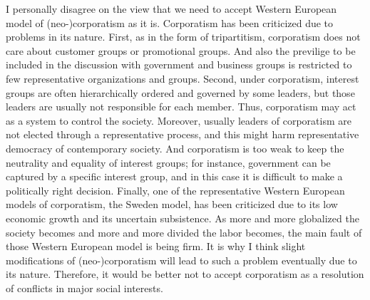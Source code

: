 \documentclass{homework}
\begin{document}
I personally disagree on the view that we need to accept Western European model of (neo-)corporatism as it is. Corporatism has been criticized due to problems in its nature. First, as in the form of tripartitism, corporatism does not care about customer groups or promotional groups. And also the previlige to be included in the discussion with government and business groups is restricted to few representative organizations and groups. Second, under corporatism, interest groups are often hierarchically ordered and governed by some leaders, but those leaders are usually not responsible for each member. Thus, corporatism may act as a system to control the society. Moreover, usually leaders of corporatism are not elected through a representative process, and this might harm representative democracy of contemporary society. And corporatism is too weak to keep the neutrality and equality of interest groups; for instance, government can be captured by a specific interest group, and in this case it is difficult to make a politically right decision. Finally, one of the representative Western European models of corporatism, the Sweden model, has been criticized due to its low economic growth and its uncertain subsistence. As more and more globalized the society becomes and more and more divided the labor becomes, the main fault of those Western European model is being firm. It is why I think slight modifications of (neo-)corporatism will lead to such a problem eventually due to its nature. Therefore, it would be better not to accept corporatism as a resolution of conflicts in major social interests.


\newpage

\end{document}
